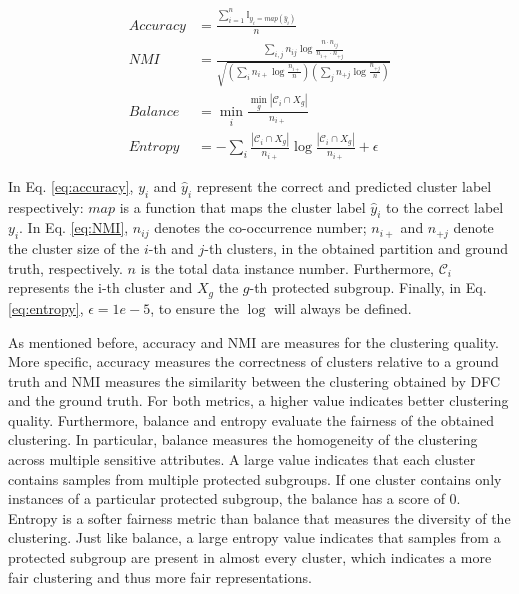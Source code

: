\begin{align}
    Accuracy &= \frac{\sum_{i=1}^n \mathbb{I}_{y_i=map(\hat{y}_i)}}{n}    
    \label{eq:accuracy}\\
    NMI &= \frac{\sum_{i,j} n_{ij}\log\frac{n\cdot n_{ij}}{n_{i+}\cdot n_{+j}}}{\sqrt{(\sum_i n_{i+}\log\frac{n_{i+}}{n}) (\sum_j n_{+j}\log\frac{n_{+j}}{n})}}
    \label{eq:NMI}\\
    Balance &= \min_i\frac{\min_g |\mathcal{C}_i\cap X_g|}{n_{i+}}    
    \label{eq:balance}\\
    Entropy &= -\sum_i \frac{|\mathcal{C}_i\cap X_g|}{n_{i+}}\log \frac{|\mathcal{C}_i\cap X_g|}{n_{i+}}+\epsilon
    \label{eq:entropy}
\end{align}


In Eq. \ref{eq:accuracy}, $y_i$ and $\hat{y}_i$ represent the correct and predicted cluster label respectively: $map$ is a function that maps the cluster label $\hat{y}_i$ to the correct label $y_i$. In 
Eq. \ref{eq:NMI}, $n_{ij}$ denotes the co-occurrence number; $n_{i+}$ and $n_{+j}$ denote the cluster size of the $i$-th and $j$-th clusters, in the obtained partition and ground truth, respectively. $n$ is the total data instance number. Furthermore, $\mathcal{C}_i$ represents the i-th cluster and $X_g$ the $g$-th protected subgroup. Finally, in Eq. \ref{eq:entropy}, $\epsilon=1e-5$, to ensure the $\log$ will always be defined.

As mentioned before, accuracy and NMI are measures for the clustering quality. More specific, accuracy measures the correctness of clusters relative to a ground truth and NMI measures the similarity between the clustering obtained by DFC and the ground truth. For both metrics, a higher value indicates better clustering quality. Furthermore, balance and entropy evaluate the fairness of the obtained clustering. In particular, balance measures the homogeneity of the clustering across multiple sensitive attributes. A large value indicates that each cluster contains samples from multiple protected subgroups. If one cluster contains only instances of a particular protected subgroup, the balance has a score of $0$.
Entropy is a softer fairness metric than balance that measures the diversity of the clustering. Just like balance, a large entropy value indicates that samples from a protected subgroup are present in almost every cluster, which indicates a more fair clustering and thus more fair representations.

